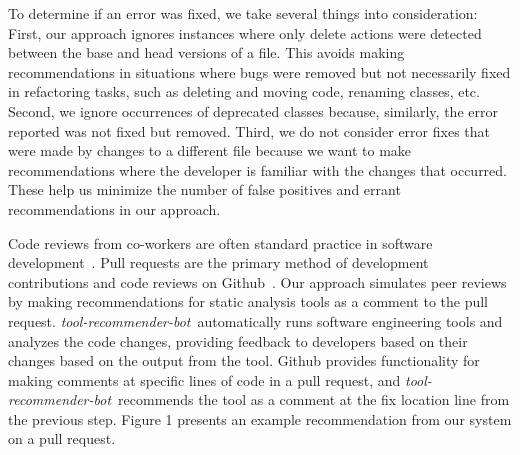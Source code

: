 \documentclass[conference]{IEEEtran}
\newcommand{\tool}{\textsl{tool-recommender-bot}}
\newcommand{\pseudosubsection}[1]{\vspace{2mm} \noindent{\it #1}}
\begin{document}
To determine if an error was fixed, we take several things into consideration: First, our approach ignores instances where only delete actions were detected between the base and head versions of a file. This avoids making recommendations in situations where bugs were removed but not necessarily fixed in refactoring tasks, such as deleting and moving code, renaming classes, etc. Second, we ignore occurrences of deprecated classes because, similarly, the error reported was not fixed but removed. Third, we do not consider error fixes that were made by changes to a different file because we want to make recommendations where the developer is familiar with the changes that occurred. These help us minimize the number of false positives and errant recommendations in our approach.


\pseudosubsection{Code Review}

Code reviews from co-workers are often standard practice in software development~\cite{CBirdCodeReviewingTrenches}. Pull requests are the primary method of development contributions and code reviews on Github~\cite{PullRequestReview}. Our approach simulates peer reviews by making recommendations for static analysis tools as a comment to the pull request. \tool~automatically runs software engineering tools and analyzes the code changes, providing feedback to developers based on their changes based on the output from the tool. Github provides functionality for making comments at specific lines of code in a pull request, and \tool~recommends the tool as a comment at the fix location line from the previous step. Figure 1 presents an example recommendation from our system on a pull request. %
\end{document}
